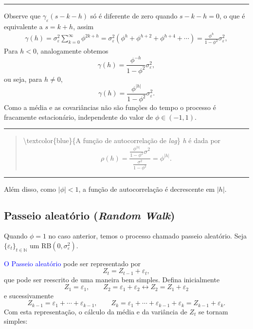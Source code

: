 \documentclass[
]{book}
\theoremstyle{definition}
\theoremstyle{definition}
\theoremstyle{definition}
\theoremstyle{remark}
\begin{document}
\begin{center}\rule{0.5\linewidth}{0.5pt}\end{center}

Observe que \(\gamma_\varepsilon(s-k-h)\) só é diferente de zero quando \(s-k-h=0\), o que é equivalente a \(s=k+h\), assim
\begin{eqnarray*}
\gamma(h)=\sigma^2_\varepsilon\sum_{k=0}^{\infty}\phi^{2k+h}=\sigma^2_\varepsilon(\phi^h+\phi^{h+2}+\phi^{h+4}+\cdots)=\frac{\phi^h}{1-\phi^2}\sigma^2_\varepsilon,
\end{eqnarray*}
Para \(h<0\), analogamente obtemos
\[\gamma(h)=\frac{\phi^{-h}}{1-\phi^2}\sigma^2_\varepsilon,\]
ou seja, para \(h\neq0\),
\[\gamma(h)=\frac{\phi^{|h|}}{1-\phi^2}\sigma^2_\varepsilon.\]
Como a média e as covariâncias não são funções do tempo o processo é
fracamente estacionário, independente do valor de \(\phi\in(-1,1)\).

\begin{center}\rule{0.5\linewidth}{0.5pt}\end{center}

\begin{quote}
\textbackslash textcolor\{blue\}\{A função de autocorrelação de \emph{lag}\} \emph{h} é dada por
\begin{equation*}
\rho(h)= \frac{\frac{\phi^|h|}{1-\phi^2}\sigma^2}{\frac{\sigma^2}{1-\phi^2}}=\phi^{|h|}.
\end{equation*}
\end{quote}

\begin{center}\rule{0.5\linewidth}{0.5pt}\end{center}

Além disso, como \(|\phi|<1\), a função de autocorrelação é decrescente em \(|h|\).

\hypertarget{passeio-aleatuxf3rio-random-walk}{%
\subsection{\texorpdfstring{Passeio aleatório (\emph{Random Walk})}{Passeio aleatório (Random Walk)}}\label{passeio-aleatuxf3rio-random-walk}}

Quando \(\phi=1\) no caso anterior, temos o processo chamado passeio aleatório.
Seja \(\{\varepsilon_t\}_{t\in\mathbb{N}}\) um RB\((0, \sigma_\varepsilon^2)\).

\textcolor{blue}{ O Passeio aleatório } pode ser representado por
\[
Z_t = Z_{t-1} + \varepsilon_t,
\]
que pode ser reescrito de uma maneira bem simples. Defina inicialmente
\[Z_1=\varepsilon_1, \qquad Z_2=\varepsilon_1+\varepsilon_2 \leftrightarrow Z_2=Z_1+\varepsilon_2\]
e sucessivamente
\[Z_{k-1}=\varepsilon_1+\cdots+\varepsilon_{k-1}, \qquad Z_k=\varepsilon_1+\cdots+\varepsilon_{k-1}+\varepsilon_k = Z_{k-1}+\varepsilon_k. \]
Com esta representação, o cálculo da média e da variância de \(Z_t\) se tornam simples:
\end{document}
